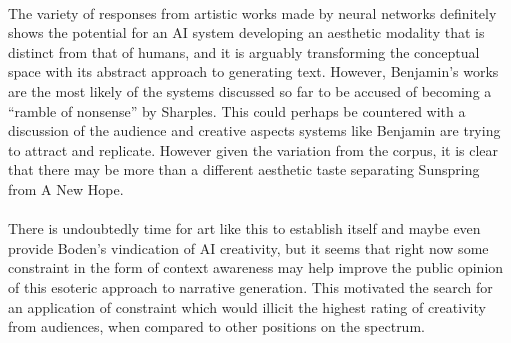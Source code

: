 \documentclass[letterpaper]{article}
\begin{document}
\\The variety of responses from artistic works made by neural networks definitely shows the potential for an AI system developing an aesthetic modality that is distinct from that of humans, and it is arguably transforming the conceptual space with its abstract approach to generating text. However, Benjamin's works are the most likely of the systems discussed so far to be accused of becoming a \enquote{ramble of nonsense} by Sharples. This could perhaps be countered with a discussion of the audience and creative aspects systems like Benjamin are trying to attract and replicate. However given the variation from the corpus, it is clear that there may be more than a different aesthetic taste separating Sunspring from A New Hope.\\
\\There is undoubtedly time for art like this to establish itself and maybe even provide Boden's vindication of AI creativity, but it seems that right now some constraint in the form of context awareness may help improve the public opinion of this esoteric approach to narrative generation. This motivated the search for an application of constraint which would illicit the highest rating of creativity from audiences, when compared to other positions on the spectrum.
\end{document}
